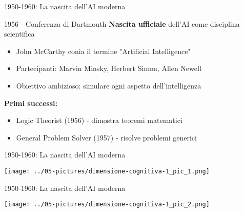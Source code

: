 \documentclass[aspectratio=169,12pt]{beamer}
\begin{document}
\begin{frame}{1950-1960: La nascita dell'AI moderna}
    
    \begin{block}{1956 - Conferenza di Dartmouth}
        \textbf{Nascita ufficiale} dell'AI come disciplina scientifica
        \begin{itemize}
            \item John McCarthy conia il termine "Artificial Intelligence"
            \item Partecipanti: Marvin Minsky, Herbert Simon, Allen Newell
            \item Obiettivo ambizioso: simulare ogni aspetto dell'intelligenza
        \end{itemize}
    \end{block}
    
    \vspace{0.3cm}
    
    \textbf{Primi successi:}
    \begin{itemize}
        \item Logic Theorist (1956) - dimostra teoremi matematici
        \item General Problem Solver (1957) - risolve problemi generici
    \end{itemize}
\end{frame}
%
%
\begin{frame}{1950-1960: La nascita dell'AI moderna}
\begin{center}
\texttt{[image: ../05-pictures/dimensione-cognitiva-1\_pic\_1.png]} 
\end{center}
\end{frame}
%
%
\begin{frame}{1950-1960: La nascita dell'AI moderna}
\begin{center}
\texttt{[image: ../05-pictures/dimensione-cognitiva-1\_pic\_2.png]} 
\end{center}
\end{frame}
%
%
\end{document}
